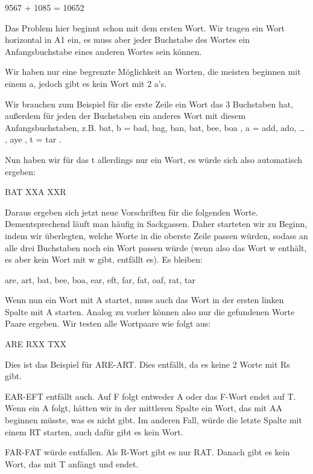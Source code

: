 \documentclass[ngerman]{fbi-aufgabenblatt}
\begin{document}
	9567
+	1085
= 10652

\newpage


Das Problem hier beginnt schon mit dem ersten Wort. Wir tragen ein Wort horizontal in A1 ein, es muss aber jeder Buchstabe des Wortes ein Anfangsbuchstabe eines anderen Wortes sein können.

Wir haben nur eine begrenzte Möglichkeit an Worten, die meisten beginnen mit einem a, jedoch gibt es kein Wort mit 2 a’s.

Wir brauchen zum Beispiel für die erste Zeile ein Wort das 3 Buchstaben hat, außerdem für jeden der Buchstaben ein anderes Wort mit diesem Anfangsbuchstaben, z.B. \glqq bat\grqq{}, b  = { bad, bag, ban, bat, bee, boa }, a = { add, ado, … , aye }, t = { tar }.

Nun haben wir für das t allerdings nur ein Wort, es würde sich also automatisch ergeben:

BAT \newline
XXA \newline
XXR

Daraus ergeben sich jetzt neue Vorschriften für die folgenden Worte. Dementsprechend läuft man häufig in Sackgassen. Daher starteten wir zu Beginn, indem wir überlegten, welche Worte in die oberste Zeile passen würden, sodass an alle drei Buchstaben noch ein Wort passen würde (wenn also das Wort w enthält, es aber kein Wort mit w gibt, entfällt es). Es bleiben:

are, art, bat, bee, boa, ear, eft, far, fat, oaf, rat, tar

Wenn nun ein Wort mit A startet, muss auch das Wort in der ersten linken Spalte mit A starten. Analog zu vorher können also nur die gefundenen Worte Paare ergeben. Wir testen alle Wortpaare wie folgt aus:

ARE \newline
RXX \newline
TXX

Dies ist das Beispiel für ARE-ART. Dies entfällt, da es keine 2 Worte mit Rs gibt.

EAR-EFT entfällt auch. Auf F folgt entweder A oder das F-Wort endet auf T. Wenn ein A folgt, hätten wir in der mittleren Spalte ein Wort, das mit AA beginnen müsste, was es nicht gibt. Im anderen Fall, würde die letzte Spalte mit einem RT starten, auch dafür gibt es kein Wort.

FAR-FAT würde entfallen. Als R-Wort gibt es nur RAT. Danach gibt es kein Wort, das mit T anfängt und endet.
\end{document}
